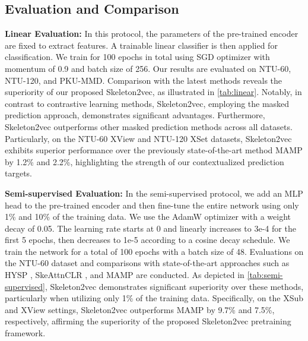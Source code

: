 \subsection{Evaluation and Comparison}
\noindent \textbf{Linear Evaluation:}
In this protocol,
the parameters of the pre-trained encoder are
fixed to extract features. A trainable linear classifier is then applied for
classification. We train for 100 epochs in total using SGD optimizer with momentum of
0.9 and batch size of 256.
Our results are evaluated on NTU-60, NTU-120, and PKU-MMD.
Comparison with the latest methods reveals the superiority of our proposed Skeleton2vec,
as illustrated in \cref{tab:linear}. Notably, in contrast to contrastive learning
methods, Skeleton2vec, employing the masked prediction approach, demonstrates significant advantages.
Furthermore, Skeleton2vec outperforms other masked prediction methods across all datasets.
Particularly, on the NTU-60 XView and NTU-120 XSet datasets, Skeleton2vec exhibits
superior performance over the previously state-of-the-art method MAMP by 1.2\% and 2.2\%,
highlighting the strength of our contextualized prediction targets.

\noindent \textbf{Semi-supervised Evaluation:}
In the semi-supervised protocol, we add an MLP head to the pre-trained
encoder and then fine-tune the entire network using only 1\% and 10\% of the training data.
We use the AdamW optimizer with a
weight decay of 0.05. The learning rate starts at 0 and linearly increases to 3e-4
for the first 5 epochs, then decreases to 1e-5 according to a cosine decay schedule.
We train the network for a total of 100 epochs with a batch size of 48.
Evaluations on the NTU-60 dataset and comparisons with state-of-the-art approaches
such as HYSP \cite{franco2023hyperbolic}, SkeAttnCLR \cite{Hua2023SkeAttnCLR}, and MAMP
\cite{mao2023masked} are conducted.
As depicted in \cref{tab:semi-supervised},
Skeleton2vec demonstrates significant superiority over these methods, particularly
when utilizing only 1\% of the training data. Specifically, on the XSub and XView
settings, Skeleton2vec outperforms MAMP by 9.7\% and 7.5\%, respectively,
affirming the superiority of the proposed Skeleton2vec pretraining framework.

